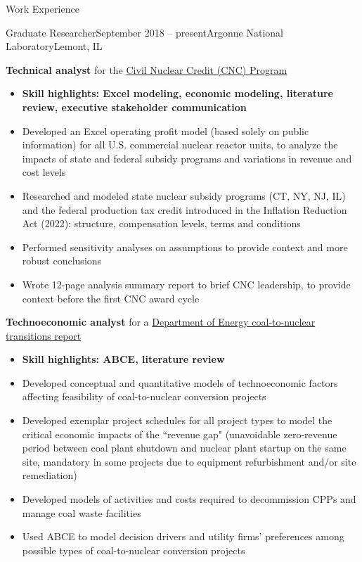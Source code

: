 \documentclass{resume} %
\begin{document}
\begin{rSection}{Work Experience}
\begin{rSubsection}{Graduate Researcher}{September 2018 -- present}{Argonne National Laboratory}{Lemont, IL}
  \item \textbf{Technical analyst} for the \href{https://www.energy.gov/gdo/civil-nuclear-credit-program}{Civil Nuclear Credit (CNC) Program}
  \begin{itemize}
    \setlength{\itemsep}{-3pt}
    \item \textbf{Skill highlights: Excel modeling, economic modeling, literature review, executive stakeholder communication}
    \item Developed an Excel operating profit model (based solely on public information) for all U.S. commercial nuclear reactor units, to analyze the impacts of state and federal subsidy programs and variations in revenue and cost levels
    \item Researched and modeled state nuclear subsidy programs (CT, NY, NJ, IL) and the federal production tax credit introduced in the Inflation Reduction Act (2022): structure, compensation levels, terms and conditions
    \item Performed sensitivity analyses on assumptions to provide context and more robust conclusions
    \item Wrote 12-page analysis summary report to brief CNC leadership, to provide context before the first CNC award cycle
  \end{itemize}

  \item \textbf{Technoeconomic analyst} for a \href{https://fuelcycleoptions.inl.gov/SiteAssets/SitePages/Home/C2N2022Report.pdf}{Department of Energy coal-to-nuclear transitions report}
  \begin{itemize}
    \setlength{\itemsep}{-3pt}
    \item \textbf{Skill highlights: ABCE, literature review}
    \item Developed conceptual and quantitative models of technoeconomic factors affecting feasibility of coal-to-nuclear conversion projects
    \item Developed exemplar project schedules for all project types to model the critical economic impacts of the ``revenue gap" (unavoidable zero-revenue period between coal plant shutdown and nuclear plant startup on the same site, mandatory in some projects due to equipment refurbishment and/or site remediation)
    \item Developed models of activities and costs required to decommission CPPs and manage coal waste facilities
    \item Used ABCE to model decision drivers and utility firms' preferences among possible types of coal-to-nuclear conversion projects
  \end{itemize}


\end{rSubsection}
\end{rSection}
\end{document}
